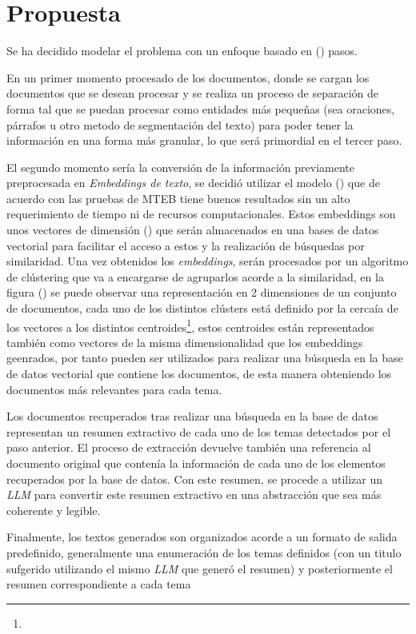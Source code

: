\chapter{Propuesta}\label{chapter:proposal}
    Se ha decidido modelar el problema con un enfoque basado en () pasos.

    En un primer momento  procesado de los documentos, donde se cargan los documentos que se desean procesar y se realiza un proceso de separación de forma tal que se puedan procesar como entidades más pequeñas (sea oraciones, párrafos u otro metodo de segmentación del texto) para poder tener la información en una forma más granular, lo que será primordial en el tercer paso.
    
    El segundo momento sería la conversión de la información previamente preprocesada en \emph{Embeddings de texto}, se decidió utilizar el modelo () que de acuerdo con las pruebas de MTEB\cite{leaderboard} tiene buenos resultados sin un alto requerimiento de tiempo ni de recursos computacionales. Estos embeddings son unos vectores de dimensión () que serán almacenados en una bases de datos vectorial para facilitar el acceso a estos y la realización de búsquedas por similaridad.
    Una vez obtenidos los \emph{embeddings}, serán procesados por un algoritmo de clústering que va a encargarse de agruparlos acorde a la similaridad, en la figura () se puede observar una representación en 2 dimensiones de un conjunto de documentos, cada uno de los distintos clústers está definido por la cercaía de los vectores a los distintos centroides\footnote{}, estos centroides están representados también como vectores de la misma dimensionalidad que los embeddings geenrados, por tanto pueden ser utilizados para realizar una búsqueda en la base de datos vectorial que contiene los documentos, de esta manera obteniendo los documentos más relevantes para cada tema.

    Los documentos recuperados tras realizar una búsqueda en la base de datos representan un resumen extractivo de cada uno de los temas detectados por el paso anterior. El proceso de extracción devuelve también una referencia al documento original que contenía la información de cada uno de los elementos recuperados por la base de datos. Con este resumen, se procede a utilizar un \emph{LLM} para convertir este resumen extractivo en una abstracción que sea más coherente y legible.

    Finalmente, los textos generados son organizados acorde a un formato de salida predefinido, generalmente una enumeración de los temas definidos (con un titulo sufgerido utilizando el mismo \emph{LLM} que generó el resumen) y posteriormente el resumen correspondiente a cada tema
